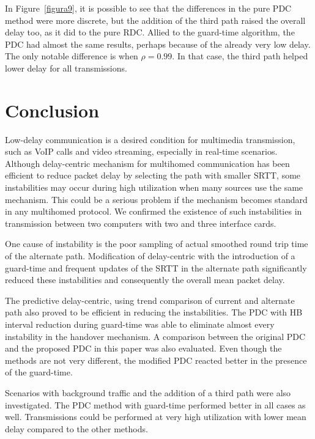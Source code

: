 \documentclass[letterpaper,10pt,oneside,conference,final]{sbrt2015}
\begin{document}
In Figure~\ref{figura9}, it is possible to see that the differences in the pure PDC method were more discrete, but the addition of the third path raised the overall delay too, as it did to the pure RDC. Allied to the guard-time algorithm, the PDC had almost the same results, perhaps because of the already very low delay. The only notable difference is when $\rho = 0.99$. In that case, the third path helped lower delay for all transmissions.


\section{Conclusion}

Low-delay communication is a desired condition for multimedia transmission, such as VoIP calls and video streaming, especially in real-time scenarios. Although delay-centric mechanism for multihomed communication has been efficient to reduce packet delay by selecting the path with smaller SRTT, some instabilities may occur during high utilization when many sources use the same mechanism. This could be a serious problem if the mechanism becomes standard in any multihomed protocol. We confirmed the existence of such instabilities in transmission between two computers with two and three interface cards.

One cause of instability is the poor sampling of actual smoothed round trip time of the alternate path. Modification of delay-centric with the introduction of a guard-time and frequent updates of the SRTT in the alternate path significantly reduced these instabilities and consequently the overall mean packet delay.

The predictive delay-centric, using trend comparison of current and alternate path also proved to be efficient in reducing the instabilities. The PDC with HB interval reduction during guard-time was able to eliminate almost every instability in the handover mechanism. A comparison between the original PDC \cite{Torres2014} and the proposed PDC in this paper was also evaluated. Even though the methods are not very different, the modified PDC reacted better in the presence of the guard-time.

Scenarios with background traffic and the addition of a third path were also investigated. The PDC method with guard-time performed better in all cases as well. Transmissions could be performed at very high utilization with lower mean delay compared to the other methods.





\end{document}
